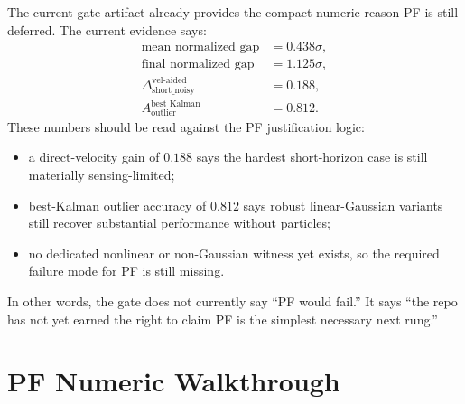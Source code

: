 \documentclass[11pt]{article}
\begin{document}
The current gate artifact already provides the compact numeric reason PF is
still deferred. The current evidence says:
\begin{align}
    \text{mean normalized gap} &= 0.438\sigma, \\
    \text{final normalized gap} &= 1.125\sigma, \\
    \Delta_{\text{short\_noisy}}^{\text{vel-aided}} &= 0.188, \\
    A_{\text{outlier}}^{\text{best Kalman}} &= 0.812.
\end{align}
These numbers should be read against the PF justification logic:
\begin{itemize}[leftmargin=1.5em]
    \item a direct-velocity gain of \(0.188\) says the hardest short-horizon
    case is still materially sensing-limited;
    \item best-Kalman outlier accuracy of \(0.812\) says robust linear-Gaussian
    variants still recover substantial performance without particles;
    \item no dedicated nonlinear or non-Gaussian witness yet exists, so the
    required failure mode for PF is still missing.
\end{itemize}
In other words, the gate does not currently say ``PF would fail.'' It says
``the repo has not yet earned the right to claim PF is the simplest necessary
next rung.''

\section{PF Numeric Walkthrough}
\end{document}
